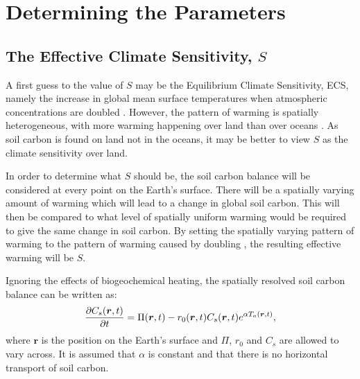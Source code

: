\section{Determining the Parameters}
\subsection{The Effective Climate Sensitivity, $S$}
A first guess to the value of $S$ may be the Equilibrium Climate Sensitivity, ECS, namely the increase in global mean surface temperatures when atmospheric  concentrations
are doubled \parencite{Sherwood2020}. However, the pattern of warming is spatially heterogeneous, with more warming happening over
land than over oceans \parencite{Morice2021}. As soil carbon is found on land not
in the oceans, it may be better to view $S$ as the climate sensitivity over land.

In order to determine what $S$ should be, the soil carbon balance will be considered at every point on the Earth's surface. There will be a spatially varying amount of warming which will
lead to a change in global soil carbon. This will then be compared to what level of spatially uniform warming would be required to give the same change in soil carbon. By setting the spatially varying
pattern of warming to the pattern of warming caused by doubling , the resulting effective warming will be $S$.

Ignoring the effects of biogeochemical heating, the spatially resolved soil carbon balance can be written as:
\begin{equation}
  \label{eq:spatially_resolved_soil_carbon}
  \pdv{C_s(\bm{r},t)}{t} = \Pi(\bm{r},t) - r_0(\bm{r},t)C_s(\bm{r},t)e^{\alpha T_a(\bm{r},t)},
\end{equation}
where $\bm{r}$ is the position on the Earth's surface and $\Pi$, $r_0$ and $C_s$ are allowed to vary across. It is assumed that $\alpha$ is constant and that there is no
horizontal transport of soil carbon.

